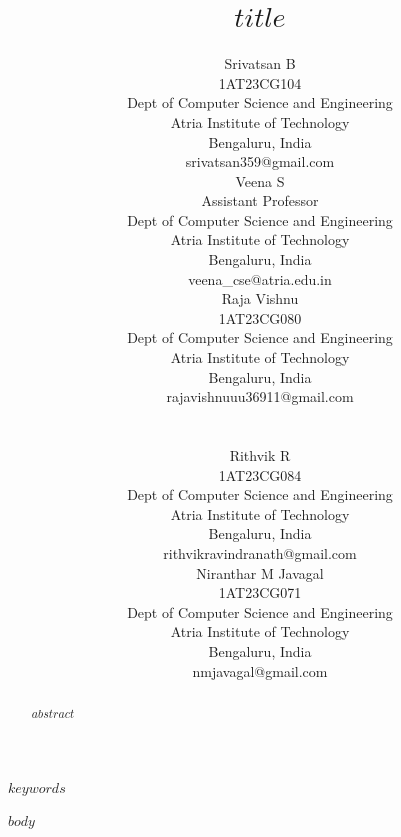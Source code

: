 \documentclass[conference]{IEEEtran}
\makeatletter
\newlength{\authcw}
\newcommand{\authA}{\small Srivatsan B\\[1pt]\footnotesize 1AT23CG104\\Dept of Computer Science and Engineering\\Atria Institute of Technology\\Bengaluru, India\\srivatsan359@gmail.com}
\newcommand{\authB}{\small Veena S\\[1pt]\footnotesize Assistant Professor\\Dept of Computer Science and Engineering\\Atria Institute of Technology\\Bengaluru, India\\veena\_cse@atria.edu.in}
\newcommand{\authC}{\small Raja Vishnu\\[1pt]\footnotesize 1AT23CG080\\Dept of Computer Science and Engineering\\Atria Institute of Technology\\Bengaluru, India\\rajavishnuuu36911@gmail.com}
\newcommand{\authD}{\small Rithvik R\\[1pt]\footnotesize 1AT23CG084\\Dept of Computer Science and Engineering\\Atria Institute of Technology\\Bengaluru, India\\rithvikravindranath@gmail.com}
\newcommand{\authE}{\small Niranthar M Javagal\\[1pt]\footnotesize 1AT23CG071\\Dept of Computer Science and Engineering\\Atria Institute of Technology\\Bengaluru, India\\nmjavagal@gmail.com}
\makeatother
\begin{document}
\title{$title$}

\author{
\hspace{0.01667\textwidth}\parbox[t]{\authcw}{\centering\authA}\hspace{0.03333\textwidth}\parbox[t]{\authcw}{\centering\authB}\hspace{0.03333\textwidth}\parbox[t]{\authcw}{\centering\authC}\\[12pt]
\hspace{0.02450\textwidth}\parbox[t]{\authcw}{\centering\authD}\hspace{0.03333\textwidth}\parbox[t]{\authcw}{\centering\authE}
}

\maketitle

\begin{abstract}
$abstract$
\end{abstract}

\begin{IEEEkeywords}
$keywords$
\end{IEEEkeywords}

$body$
\end{document}
